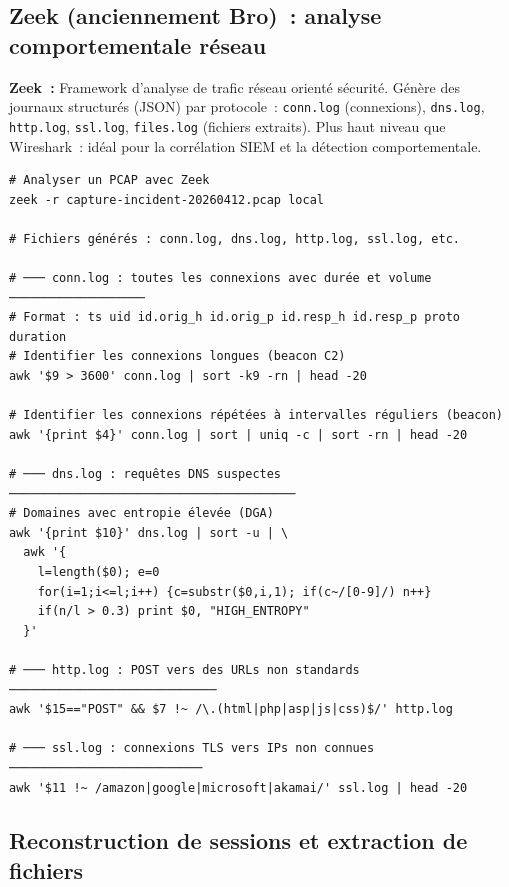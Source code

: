 \subsection{Zeek (anciennement Bro)~: analyse comportementale réseau}

\begin{boxdef}
\textbf{Zeek~:} Framework d'analyse de trafic réseau orienté sécurité.
Génère des journaux structurés (JSON) par protocole~: \texttt{conn.log}
(connexions), \texttt{dns.log}, \texttt{http.log}, \texttt{ssl.log},
\texttt{files.log} (fichiers extraits). Plus haut niveau que Wireshark~:
idéal pour la corrélation SIEM et la détection comportementale.
\end{boxdef}

\begin{lstlisting}[style=StyleTerminal,
  caption={Analyse Zeek sur une capture PCAP},
  label={lst:zeek-analysis}]
# Analyser un PCAP avec Zeek
zeek -r capture-incident-20260412.pcap local

# Fichiers générés : conn.log, dns.log, http.log, ssl.log, etc.

# ─── conn.log : toutes les connexions avec durée et volume ───────────────────
# Format : ts uid id.orig_h id.orig_p id.resp_h id.resp_p proto duration
# Identifier les connexions longues (beacon C2)
awk '$9 > 3600' conn.log | sort -k9 -rn | head -20

# Identifier les connexions répétées à intervalles réguliers (beacon)
awk '{print $4}' conn.log | sort | uniq -c | sort -rn | head -20

# ─── dns.log : requêtes DNS suspectes ────────────────────────────────────────
# Domaines avec entropie élevée (DGA)
awk '{print $10}' dns.log | sort -u | \
  awk '{
    l=length($0); e=0
    for(i=1;i<=l;i++) {c=substr($0,i,1); if(c~/[0-9]/) n++}
    if(n/l > 0.3) print $0, "HIGH_ENTROPY"
  }'

# ─── http.log : POST vers des URLs non standards ─────────────────────────────
awk '$15=="POST" && $7 !~ /\.(html|php|asp|js|css)$/' http.log

# ─── ssl.log : connexions TLS vers IPs non connues ───────────────────────────
awk '$11 !~ /amazon|google|microsoft|akamai/' ssl.log | head -20
\end{lstlisting}

\subsection{Reconstruction de sessions et extraction de fichiers}

